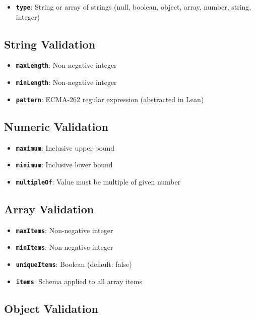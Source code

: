 \begin{itemize}
  \item \textbf{\texttt{type}}: String or array of strings (null, boolean, object, array, number, string, integer)
\end{itemize}

\subsection{String Validation}

\begin{itemize}
  \item \textbf{\texttt{maxLength}}: Non-negative integer
  \item \textbf{\texttt{minLength}}: Non-negative integer
  \item \textbf{\texttt{pattern}}: ECMA-262 regular expression (abstracted in Lean)
\end{itemize}

\subsection{Numeric Validation}

\begin{itemize}
  \item \textbf{\texttt{maximum}}: Inclusive upper bound
  \item \textbf{\texttt{minimum}}: Inclusive lower bound
  \item \textbf{\texttt{multipleOf}}: Value must be multiple of given number
\end{itemize}

\subsection{Array Validation}

\begin{itemize}
  \item \textbf{\texttt{maxItems}}: Non-negative integer
  \item \textbf{\texttt{minItems}}: Non-negative integer
  \item \textbf{\texttt{uniqueItems}}: Boolean (default: false)
  \item \textbf{\texttt{items}}: Schema applied to all array items
\end{itemize}

\subsection{Object Validation}

